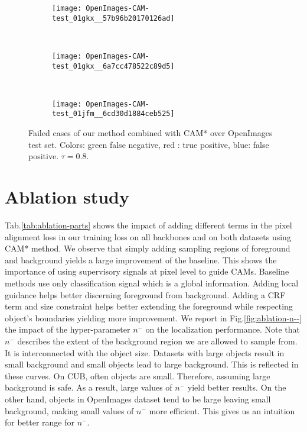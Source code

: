 \documentclass[twocolumn]{article}
\theoremstyle{definition}
\begin{document}
\begin{figure}
     \centering
     \begin{subfigure}[b]{0.45\textwidth}
         \centering
         \texttt{[image: OpenImages-CAM-test\_01gkx\_\_57b96b20170126ad]}
     \end{subfigure}
     \\
     \vspace{.2cm}
     \begin{subfigure}[b]{0.45\textwidth}
         \centering
         \texttt{[image: OpenImages-CAM-test\_01gkx\_\_6a7cc478522c89d5]}
     \end{subfigure}
     \\
     \vspace{.2cm}
     \begin{subfigure}[b]{0.45\textwidth}
         \centering
         \texttt{[image: OpenImages-CAM-test\_01jfm\_\_6cd30d1884ceb525]}
     \end{subfigure}
        \caption{Failed cases of our method combined with CAM* over OpenImages test set.
        Colors: green false negative, red : true positive, blue: false positive. ${\tau=0.8}$.}
        \label{fig:failure}
\end{figure}

\section{Ablation study}
\label{sec:ablations}
Tab.\ref{tab:ablation-parts} shows the impact of adding different terms in the pixel alignment loss in our training loss on all backbones and on both datasets using CAM* method. We observe that simply adding sampling regions of foreground and background yields a large improvement of the baseline. This shows the importance of using supervisory signals at pixel level to guide CAMs. Baseline methods use only classification signal which is a global information. Adding local guidance helps better discerning foreground from background. Adding a CRF term and size constraint helps better extending the foreground while respecting object's boundaries yielding more improvement.
We report in Fig.\ref{fig:ablation-n--} the impact of the hyper-parameter ${n^-}$ on the localization performance. Note that ${n^-}$ describes the extent of the background region we are allowed to sample from. It is interconnected with the object size. Datasets with large objects result in small background and small objects lead to large background. This is reflected in these curves. On CUB, often objects are small. Therefore, assuming large background is safe. As a result, large values of ${n^-}$  yield better results. On the other hand, objects in OpenImages dataset tend to be large leaving small background, making small values of ${n^-}$ more efficient. This gives us an intuition for better range for ${n^-}$.
\end{document}
